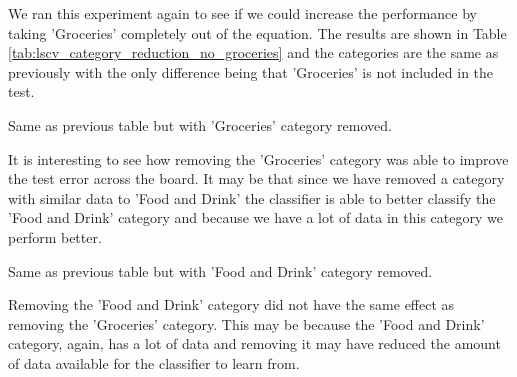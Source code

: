 We ran this experiment again to see if we could increase the performance by taking 'Groceries' completely out of the equation. The results are shown in Table \ref{tab:lscv_category_reduction_no_groceries} and the categories are the same as previously with the only difference being that 'Groceries' is not included in the test.

\begin{table}[ht]
    \centering  
    \caption{Same as previous table but with 'Groceries' category removed.}
    
    \label{tab:lscv_category_reduction_no_groceries} 
\end{table}

It is interesting to see how removing the 'Groceries' category was able to improve the test error across the board. It may be that since we have removed a category with similar data to 'Food and Drink' the classifier is able to better classify the 'Food and Drink' category and because we have a lot of data in this category we perform better. 

\begin{table}[ht]
    \centering  
    \caption{Same as previous table but with 'Food and Drink' category removed.}
    
    \label{tab:lscv_category_reduction_no_food} 
\end{table}

Removing the 'Food and Drink' category did not have the same effect as removing the 'Groceries' category. This may be because the 'Food and Drink' category, again, has a lot of data and removing it may have reduced the amount of data available for the classifier to learn from.